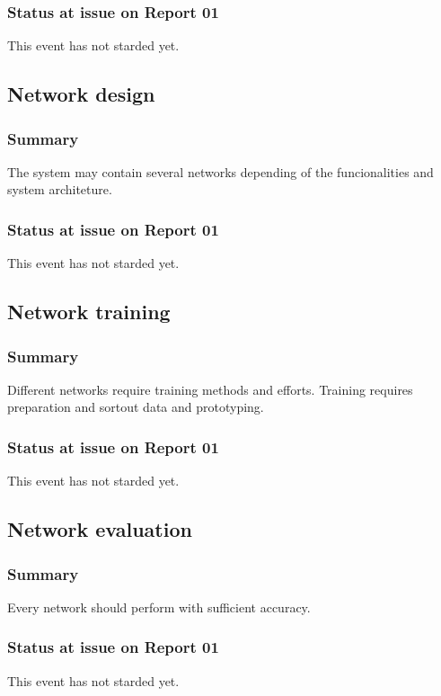 \documentclass{article}
\begin{document}
\subsubsection{Status at issue on Report 01}
\label{sec:org0b0e16f}
This event has not starded yet.

\subsection{Network design}
\label{sec:org87aed74}
\subsubsection{Summary}
\label{sec:orga922d84}
The system may contain several networks depending of the funcionalities and system architeture.

\subsubsection{Status at issue on Report 01}
\label{sec:orgdca729b}
This event has not starded yet.

\subsection{Network training}
\label{sec:orgf3bfe4d}
\subsubsection{Summary}
\label{sec:org999dfeb}
Different networks require training methods and efforts.
Training requires preparation and sortout data and prototyping.

\subsubsection{Status at issue on Report 01}
\label{sec:org3342ea7}
This event has not starded yet.

\subsection{Network evaluation}
\label{sec:org633b5b9}
\subsubsection{Summary}
\label{sec:orgac7a7b3}
Every network should perform with sufficient accuracy.
\subsubsection{Status at issue on Report 01}
\label{sec:org1781c49}
This event has not starded yet.
\end{document}
